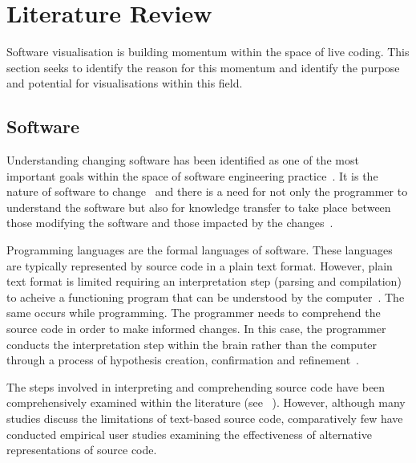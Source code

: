
\chapter{Literature Review}


Software visualisation is building momentum within the space of live coding. This section seeks to identify the reason for this momentum and identify the purpose and potential for visualisations within this field.


\section{Software}

Understanding changing software has been identified as one of the most important goals within the space of software engineering practice~\cite{Tao2012}. It is the nature of software to change~\cite{Brooks1995} and there is a need for not only the programmer to understand the software but also for knowledge transfer to take place between those modifying the software and those impacted by the changes~\cite{Tao2012}.

Programming languages are the formal languages of software. These languages are typically represented by source code in a plain text format. However, plain text format is limited requiring an interpretation step (parsing and compilation) to acheive a functioning program that can be understood by the computer~\cite{Badros2000}. The same occurs while programming. The programmer needs to comprehend the source code in order to make informed changes. In this case, the programmer conducts the interpretation step within the brain rather than the computer through a process of hypothesis creation, confirmation and refinement~\cite{Brooks1983}.

The steps involved in interpreting and comprehending source code have been comprehensively examined within the literature (see ~\cite{Novais2013,McLean2010a,Brooks1995,Desmond,Rajlich2002}). However, although many studies discuss the limitations of text-based source code, comparatively few have conducted empirical user studies examining the effectiveness of alternative representations of source code.

